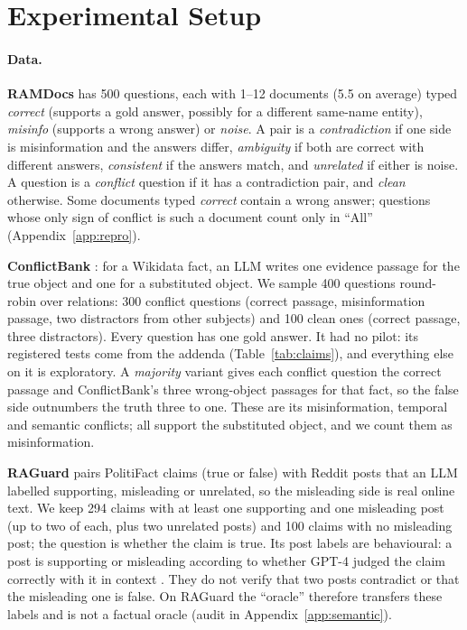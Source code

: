 \section{Experimental Setup}
\label{sec:setup}

\paragraph{Data.}
\textbf{RAMDocs} \citep{wang2025madam} has 500 questions, each with 1--12 documents (5.5 on average) typed
\emph{correct} (supports a gold answer, possibly for a different same-name entity), \emph{misinfo} (supports a wrong
answer) or \emph{noise}. A pair is a \emph{contradiction} if one side is misinformation and the answers differ,
\emph{ambiguity} if both are correct with different answers, \emph{consistent} if the answers match, and
\emph{unrelated} if either is noise. A question is a \emph{conflict} question if it has a contradiction pair, and
\emph{clean} otherwise. Some documents typed \emph{correct} contain a wrong answer; questions whose only sign of
conflict is such a document count only in ``All'' (Appendix~\ref{app:repro}).

\textbf{ConflictBank} \citep{su2024conflictbank}: for a Wikidata fact, an LLM writes one evidence passage for the true
object and one for a substituted object. We sample 400 questions round-robin over relations: 300 conflict questions
(correct passage, misinformation passage, two distractors from other subjects) and 100 clean ones (correct passage,
three distractors). Every question has one gold answer. It had no pilot: its registered tests come from the addenda (Table~\ref{tab:claims}), and everything else on it is exploratory. A
\emph{majority} variant gives each conflict question the correct passage and ConflictBank's three wrong-object
passages for that fact, so the false side outnumbers the truth three to one. These are its misinformation, temporal
and semantic conflicts; all support the substituted object, and we count them as misinformation.

\textbf{RAGuard} \citep{zeng2025raguard} pairs PolitiFact claims (true or false) with Reddit posts that an LLM
labelled supporting, misleading or unrelated, so the misleading side is real online text. We keep 294 claims with at
least one supporting and one misleading post (up to two of each, plus two unrelated posts) and 100 claims with no
misleading post; the question is whether the claim is true. Its post labels are behavioural: a post is supporting or misleading according to whether GPT-4 judged the claim correctly with it in context \citep[\S3.3]{zeng2025raguard}. They do not verify that two posts contradict or that the misleading one is false. On RAGuard the ``oracle'' therefore transfers these labels and is not a factual oracle (audit in Appendix~\ref{app:semantic}).

